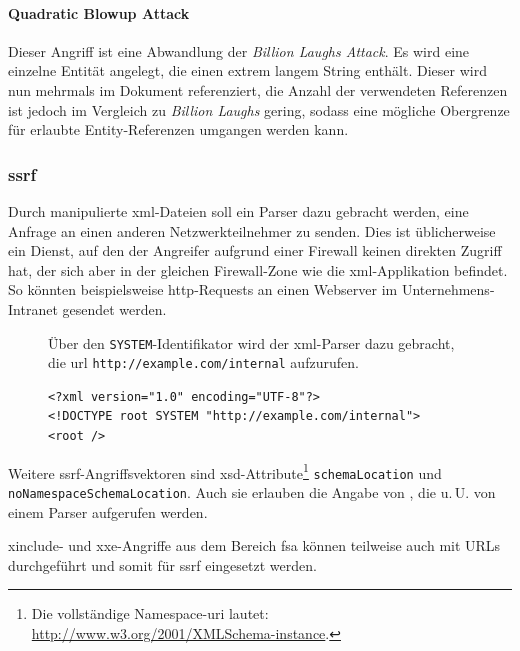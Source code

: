 \paragraph{Quadratic Blowup Attack}
Dieser Angriff ist eine Abwandlung der \emph{Billion Laughs Attack}. Es wird eine einzelne Entität angelegt, die einen extrem langem String enthält. Dieser wird nun mehrmals im Dokument referenziert, die Anzahl der verwendeten Referenzen ist jedoch im Vergleich zu \emph{Billion Laughs} gering, sodass eine mögliche Obergrenze für erlaubte Entity-Referenzen umgangen werden kann.

\subsubsection{\acrlong{ssrf}}
\label{sec:xmlattacks-ssrf}

Durch manipulierte \acrshort{xml}-Dateien soll ein Parser dazu gebracht werden, eine Anfrage an einen anderen Netzwerkteilnehmer zu senden. Dies ist üblicherweise ein Dienst, auf den der Angreifer aufgrund einer Firewall keinen direkten Zugriff hat, der sich aber in der gleichen Firewall-Zone wie die \acrshort{xml}-Applikation befindet. So könnten beispielsweise \acrshort{http}-Requests an einen Webserver im Unternehmens-Intranet gesendet werden.

\begin{figure}[h]
    \begin{example} Über den \texttt{SYSTEM}-Identifikator wird der \acrshort{xml}-Parser dazu gebracht, die \acrshort{url} \texttt{http://example.com/internal} aufzurufen.
        \begin{verbatim}
<?xml version="1.0" encoding="UTF-8"?>
<!DOCTYPE root SYSTEM "http://example.com/internal">
<root />
        \end{verbatim}
    \end{example}
\end{figure}

Weitere \acrshort{ssrf}-Angriffsvektoren sind \acrshort{xsd}-Attribute\footnote{Die vollständige Namespace-\acrshort{uri} lautet: \url{http://www.w3.org/2001/XMLSchema-instance}.} \texttt{schemaLocation} und \texttt{noNamespaceSchemaLocation}. Auch sie erlauben die Angabe von , die u.\,U. von einem Parser aufgerufen werden.\cite[S.~8f]{morgan2014xml}

\acrshort{xinclude}- und \acrshort{xxe}-Angriffe aus dem Bereich \acrlong{fsa} können teilweise auch mit URLs durchgeführt und somit für \acrlong{ssrf} eingesetzt werden.

